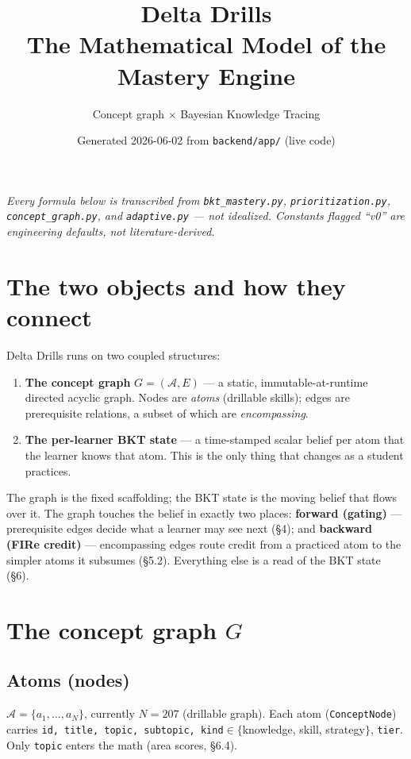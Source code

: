 \documentclass[11pt]{article}
\title{\textbf{\textcolor{accent}{Delta Drills}}\\[2pt]
\large The Mathematical Model of the Mastery Engine}
\author{Concept graph $\times$ Bayesian Knowledge Tracing}
\date{Generated 2026-06-02 from \texttt{backend/app/} (live code)}
\begin{document}
\maketitle

\noindent\small\emph{Every formula below is transcribed from
\texttt{bkt\_mastery.py}, \texttt{prioritization.py}, \texttt{concept\_graph.py},
and \texttt{adaptive.py} --- not idealized. Constants flagged ``v0'' are
engineering defaults, not literature-derived.}\normalsize

\section{The two objects and how they connect}

Delta Drills runs on two coupled structures:

\begin{enumerate}[leftmargin=1.4em]
  \item \textbf{The concept graph} $G=(\mathcal{A},E)$ --- a static,
  immutable-at-runtime directed acyclic graph. Nodes are \emph{atoms}
  (drillable skills); edges are prerequisite relations, a subset of which are
  \emph{encompassing}.
  \item \textbf{The per-learner BKT state} --- a time-stamped scalar belief per
  atom that the learner knows that atom. This is the only thing that changes as
  a student practices.
\end{enumerate}

The graph is the fixed scaffolding; the BKT state is the moving belief that flows
over it. The graph touches the belief in exactly two places:
\textbf{forward (gating)} --- prerequisite edges decide what a learner may see
next (\S4); and \textbf{backward (FIRe credit)} --- encompassing edges route
credit from a practiced atom to the simpler atoms it subsumes (\S5.2).
Everything else is a read of the BKT state (\S6).

\section{The concept graph $G$}

\subsection{Atoms (nodes)}
$\mathcal{A}=\{a_1,\dots,a_N\}$, currently $N=207$ (drillable graph). Each atom
(\texttt{ConceptNode}) carries \texttt{id, title, topic, subtopic,
kind}$\in\{$knowledge, skill, strategy$\}$, \texttt{tier}. Only \texttt{topic}
enters the math (area scores, \S6.4).
\end{document}
